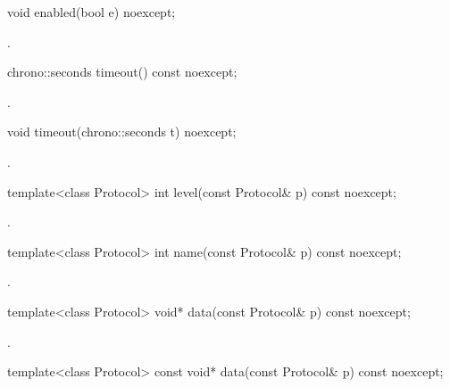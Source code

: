 \begin{itemdecl}
void enabled(bool e) noexcept;
\end{itemdecl}

\begin{itemdescr}
\pnum
\postconditions {}.
\end{itemdescr}

\begin{itemdecl}
chrono::seconds timeout() const noexcept;
\end{itemdecl}

\begin{itemdescr}
\pnum
\returns {}.
\end{itemdescr}

\begin{itemdecl}
void timeout(chrono::seconds t) noexcept;
\end{itemdecl}

\begin{itemdescr}
\pnum
\postconditions {}.
\end{itemdescr}

\begin{itemdecl}
template<class Protocol> int level(const Protocol& p) const noexcept;
\end{itemdecl}

\begin{itemdescr}
\pnum
\returns {}.
\end{itemdescr}

\begin{itemdecl}
template<class Protocol> int name(const Protocol& p) const noexcept;
\end{itemdecl}

\begin{itemdescr}
\pnum
\returns {}.
\end{itemdescr}

\begin{itemdecl}
template<class Protocol> void* data(const Protocol& p) const noexcept;
\end{itemdecl}

\begin{itemdescr}
\pnum
\returns {}.
\end{itemdescr}

\begin{itemdecl}
template<class Protocol> const void* data(const Protocol& p) const noexcept;
\end{itemdecl}

